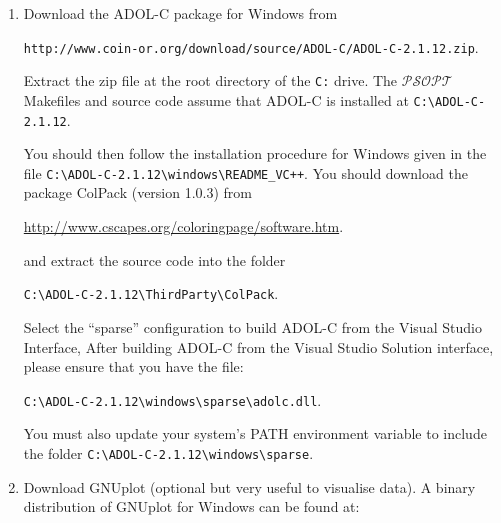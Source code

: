 \documentclass[a4paper,11pt]{report}    %
\newcommand{\psopt}{$\mathcal{PSOPT}$\,}  %
\newenvironment{shadedframe}{%
  \def\FrameCommand{\fcolorbox{black}{shadecolor}}%
  \MakeFramed {\FrameRestore}}
{\endMakeFramed}
\begin{document}
\begin{enumerate}
After building the library, you should have the following file:

\begin{verbatim}
C:\snopt7\win32\snopt.lib
\end{verbatim}




\item Download the ADOL-C package for Windows from 

\small
\verb|http://www.coin-or.org/download/source/ADOL-C/ADOL-C-2.1.12.zip|. 
\normalsize

Extract the zip file at the root directory of the \verb|C:| drive. The \psopt Makefiles and source code assume 
that ADOL-C is installed at  \verb|C:\ADOL-C-2.1.12|. 




You should then follow the installation procedure
for Windows given in the file \verb|C:\ADOL-C-2.1.12\windows\README_VC++|. You should download
the package ColPack (version 1.0.3) from 

\href{http://www.cscapes.org/coloringpage/software.htm}{http://www.cscapes.org/coloringpage/software.htm}.


and extract the source code into the folder 

\verb|C:\ADOL-C-2.1.12\ThirdParty\ColPack|. 

Select the ``sparse'' configuration
to build ADOL-C from the Visual Studio Interface, After building ADOL-C from
the Visual Studio Solution interface, please ensure that you have the file:

\small
\verb|C:\ADOL-C-2.1.12\windows\sparse\adolc.dll|. 
\normalsize


You must also update your system's PATH environment variable to include the folder \verb|C:\ADOL-C-2.1.12\windows\sparse|.

\item Download GNUplot (optional  but very useful to visualise data). A binary distribution
of GNUplot for Windows can be found at: 


\end{enumerate}
\end{document}
